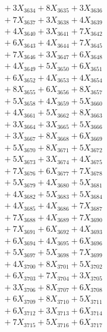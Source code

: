 \documentclass[a4paper,10pt]{article}
\begin{document}
{\begin{align}
&\;  + 3 X_{3634} + 8 X_{3635} + 3 X_{3636} \\[0.3ex]
&\;  + 7 X_{3637} + 3 X_{3638} + 4 X_{3639} \\[0.5ex]\allowbreak
&\;  + 4 X_{3640} + 3 X_{3641} + 7 X_{3642} \\[0.3ex]
&\;  + 6 X_{3643} + 4 X_{3644} + 7 X_{3645} \\[0.3ex]
&\;  + 7 X_{3646} + 3 X_{3647} + 6 X_{3648} \\[0.3ex]
&\;  + 4 X_{3649} + 5 X_{3650} + 6 X_{3651} \\[0.3ex]
&\;  + 6 X_{3652} + 4 X_{3653} + 4 X_{3654} \\[0.3ex]
&\;  + 8 X_{3655} + 6 X_{3656} + 8 X_{3657} \\[0.3ex]
&\;  + 5 X_{3658} + 4 X_{3659} + 5 X_{3660} \\[0.3ex]
&\;  + 4 X_{3661} + 5 X_{3662} + 8 X_{3663} \\[0.3ex]
&\;  + 3 X_{3664} + 3 X_{3665} + 5 X_{3666} \\[0.3ex]
&\;  + 3 X_{3667} + 8 X_{3668} + 6 X_{3669} \\[0.5ex]\allowbreak
&\;  + 5 X_{3670} + 8 X_{3671} + 5 X_{3672} \\[0.3ex]
&\;  + 5 X_{3673} + 3 X_{3674} + 4 X_{3675} \\[0.3ex]
&\;  + 7 X_{3676} + 6 X_{3677} + 7 X_{3678} \\[0.3ex]
&\;  + 5 X_{3679} + 4 X_{3680} + 5 X_{3681} \\[0.3ex]
&\;  + 4 X_{3682} + 5 X_{3683} + 5 X_{3684} \\[0.3ex]
&\;  + 4 X_{3685} + 4 X_{3686} + 7 X_{3687} \\[0.3ex]
&\;  + 7 X_{3688} + 4 X_{3689} + 7 X_{3690} \\[0.3ex]
&\;  + 7 X_{3691} + 6 X_{3692} + 4 X_{3693} \\[0.3ex]
&\;  + 6 X_{3694} + 4 X_{3695} + 6 X_{3696} \\[0.3ex]
&\;  + 5 X_{3697} + 5 X_{3698} + 7 X_{3699} \\[0.5ex]\allowbreak
&\;  + 4 X_{3700} + 8 X_{3701} + 5 X_{3702} \\[0.3ex]
&\;  + 6 X_{3703} + 7 X_{3704} + 3 X_{3705} \\[0.3ex]
&\;  + 3 X_{3706} + 8 X_{3707} + 6 X_{3708} \\[0.3ex]
&\;  + 6 X_{3709} + 8 X_{3710} + 5 X_{3711} \\[0.3ex]
&\;  + 6 X_{3712} + 3 X_{3713} + 6 X_{3714} \\[0.3ex]
&\;  + 7 X_{3715} + 5 X_{3716} + 6 X_{3717} \\[0.3ex]

\end{align}}
\end{document}
